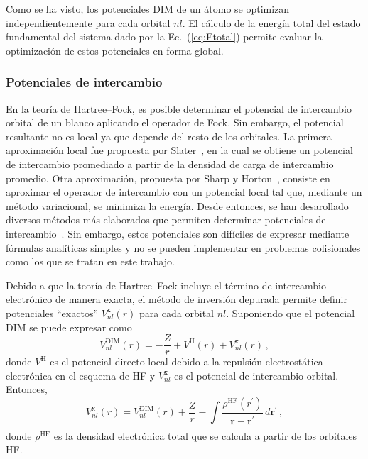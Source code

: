 Como se ha visto, los potenciales DIM de un átomo se optimizan 
independientemente para cada orbital $nl$. El cálculo de la energía 
total del estado fundamental del sistema dado por la 
Ec.~(\ref{eq:Etotal}) permite evaluar la optimización de estos 
potenciales en forma global.

\subsubsection*{Potenciales de intercambio}

En la teoría de Hartree--Fock, es posible determinar el potencial de 
intercambio orbital de un blanco aplicando el operador de Fock. Sin 
embargo, el potencial resultante no es local ya que depende del resto de 
los orbitales. La primera aproximación local fue propuesta por 
Slater~\cite{Slater:51}, en la cual se obtiene un potencial de 
intercambio promediado a partir de la densidad de carga de intercambio 
promedio. Otra aproximación, propuesta por Sharp y 
Horton~\cite{Sharp:53}, consiste en aproximar el operador de intercambio 
con un potencial local tal que, mediante un método variacional, se 
minimiza la energía. Desde entonces, se han desarollado diversos métodos 
más elaborados que permiten determinar potenciales de 
intercambio~\cite{Krieger:92,Gorling:92,Yang:02,Staroverov:06,
Ryabinkin:13}. Sin embargo, estos potenciales son difíciles de expresar 
mediante fórmulas analíticas simples y no se pueden implementar en 
problemas colisionales como los que se tratan en este trabajo.

Debido a que la teoría de Hartree--Fock incluye el término de 
intercambio electrónico de manera exacta, el método de inversión 
depurada permite definir potenciales ``exactos'' 
$V_{nl}^{\mathrm{x}}(r)$ para cada orbital $nl$. Suponiendo que el 
potencial DIM se puede expresar como
\begin{equation}
V_{nl}^{\mathrm{DIM}}(r) = -\frac{Z}{r} + V^{\mathrm{H}}(r) 
+ V_{nl}^{\mathrm{x}}(r) \, , 
\label{eq:VDIM}
\end{equation}
donde $V^{\mathrm{H}}$ es el potencial directo local debido a la 
repulsión electrostática electrónica en el esquema de HF y 
$V_{nl}^{\mathrm{x}}$ es el potencial de intercambio orbital. Entonces,
\begin{equation}
V_{nl}^{\mathrm{x}}(r)=V_{nl}^{\mathrm{DIM}}(r)+\frac{Z}{r}
-\int{ \frac{\rho^{\mathrm{HF}}(r^{\prime})  }
{\left| \mathbf{r} - \mathbf{r^{\prime}} \right|}} \, 
d \mathbf{r^{\prime}} \, ,
\label{eq:exchange-potential}
\end{equation}
donde $\rho^{\mathrm{HF}}$ es la densidad electrónica total que se
calcula a partir de los orbitales HF.

